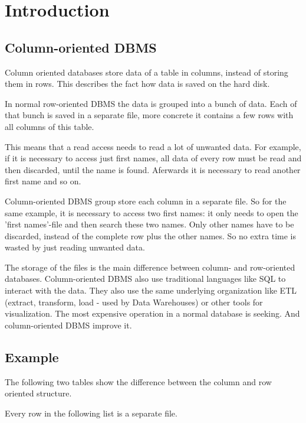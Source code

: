 
\section{Introduction}
\subsection{Column-oriented DBMS}

Column oriented databases store data of a table in columns, instead of storing them in rows. 
This describes the fact how data is saved on the hard disk.

In normal row-oriented DBMS the data is grouped into a bunch of data. 
Each of that bunch is saved in a separate file, more concrete it contains a few rows with all columns of this table. 
\cite{hbase.stavros.harizopoulos.2009}

This means that a read access needs to read a lot of unwanted data.
For example, if it is necessary to access just first names, all data of every row must be read and then discarded, until the name is found. 
Aferwards it is necessary to read another first name and so on. 
\cite{hbase.stavros.harizopoulos.2009}

Column-oriented DBMS group store each column in a separate file. 
So for the same example, it is necessary to access two first names: it only needs to open the 'first names'-file and then search these two names.
Only other names have to be discarded, instead of the complete row plus the other names.
So no extra time is wasted by just reading unwanted data.
\cite{hbase.daniel.abadi.2010}

The storage of the files is the main difference between column- and row-oriented databases.
Column-oriented DBMS also use traditional languages like SQL to interact with the data.
They also use the same underlying organization like ETL (extract, transform, load - used by Data Warehouses) or other tools for visualization.
\cite{hbase.amazon.2017}
The most expensive operation in a normal database is seeking. 
And column-oriented DBMS improve it.


\newpage

\subsection{Example}
The following two tables show the difference between the column and row oriented structure.

Every row in the following list is a separate file.

